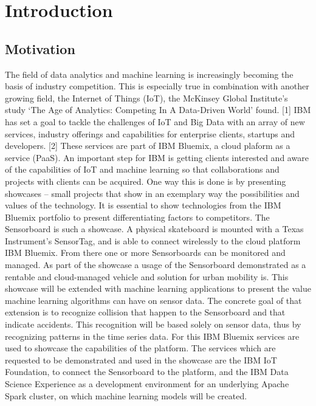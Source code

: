 \chapter{Introduction}
\label{ch:Introduction}

\section{Motivation}
\label{sec:Motivation}
The field of data analytics and machine learning is increasingly becoming the basis of industry competition. This is especially true in combination with another growing field, the Internet of Things (IoT), the McKinsey Global Institute’s study ‘The Age of Analytics: Competing In A Data-Driven World’ found. [1] IBM has set a goal to tackle the challenges of IoT and Big Data with an array of new services, industry offerings and capabilities for enterprise clients, startups and developers. [2] These services are part of IBM Bluemix, a cloud plaform  as a service (PaaS). 
\newline
An important step for IBM is getting clients interested and aware of the capabilities of IoT and machine learning so that collaborations and projects with clients can be acquired. One way this is done is by presenting showcases – small projects that show in an exemplary way the possibilities and values of the technology. It is essential to show technologies from the IBM Bluemix portfolio to present differentiating factors to competitors.
 \newline
The Sensorboard is such a showcase. A physical skateboard is mounted with a Texas Instrument’s SensorTag, and is able to connect wirelessly to the cloud platform IBM Bluemix. From there one or more Sensorboards can be monitored and managed. As part of the showcase a usage of the Sensorboard demonstrated as a rentable and cloud-managed vehicle and solution for urban mobility is.
 \newline
This showcase will be extended with machine learning applications to present the value machine learning algorithms can have on sensor data. The concrete goal of that extension is to recognize collision that happen to the Sensorboard and that indicate accidents. This recognition will be based solely on sensor data, thus by recognizing patterns in the time series data. For this IBM Bluemix services are used to showcase the capabilities of the platform. The services which are requested to be demonstrated and used in the showcase are the IBM IoT Foundation, to connect the Sensorboard to the platform, and the IBM Data Science Experience as a development environment for an underlying Apache Spark cluster, on which machine learning models will be created.

